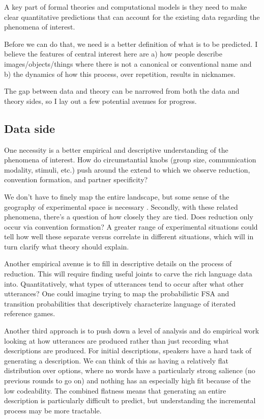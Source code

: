 \documentclass[]{article}
\begin{document}
	A key part of formal theories and computational models is they need to make clear quantitative predictions that can account for the existing data regarding the phenomena of interest. 
	
	
	Before we can do that, we need is a better definition of what is to be predicted. I believe the features of central interest here are a) how people describe images/objects/things where there is not a canonical or conventional name and b) the dynamics of how this process, over repetition, results in nicknames. %
	
 The gap between data and theory can be narrowed from both the data and theory sides, so I lay out a few potential avenues for progress. 

\subsection{Data side}
	
	One necessity is a better empirical and descriptive understanding of the phenomena of interest. How do circumstantial knobs (group size, communication modality, stimuli, etc.) push around the extend to which we observe reduction, convention formation, and partner specificity? 
	
	We don't have to finely map the entire landscape, but some sense of the geography of experimental space is necessary \citep{almaatouq2022}. Secondly, with these related phenomena, there's a question of how closely they are tied. Does reduction only occur via convention formation? A greater range of experimental situations could tell how well these separate versus correlate in different situations, which will in turn clarify what theory should explain. 
	
	Another empirical avenue is to fill in descriptive details on the process of reduction. This will require finding useful joints to carve the rich language data into. Quantitatively, what types of utterances tend to occur after what other utterances? One could imagine trying to map the probabilistic FSA and transition probabilities that descriptively characterize language of iterated reference games.
	
	Another third approach is to push down a level of analysis and do empirical work looking at how utterances are produced rather than just recording what descriptions are produced. For initial descriptions, speakers have a hard task of generating a description. We can think of this as having a relatively flat distribution over options, where no words have a particularly strong salience (no previous rounds to go on) and nothing has an especially high fit because of the low codeability. The combined flatness means that generating an entire description is particularly difficult to predict, but understanding the incremental process may be more tractable.
	
\end{document}
